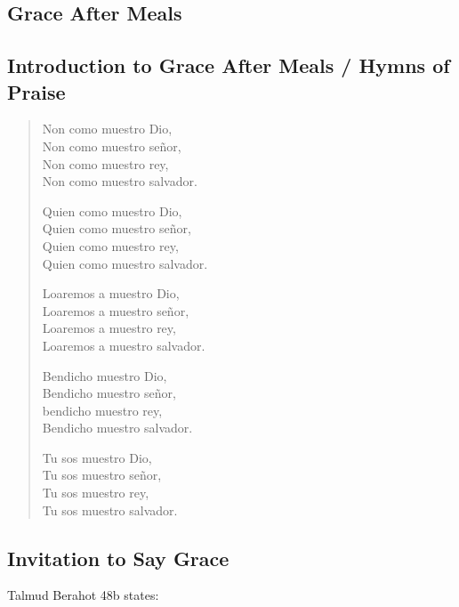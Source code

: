 ﻿\documentclass[a5paper, 12pt]{Birchon}
\begin{document}
\begin{english}
\section*{Grace After Meals}
\subsection*{Introduction to Grace After Meals / Hymns of Praise}
\begin{verse}

Non como muestro Dio,\\Non como muestro señor,\\
Non como muestro rey,\\Non como muestro salvador.

Quien como muestro Dio,\\Quien como muestro señor,\\
Quien como muestro rey,\\Quien como muestro salvador.

Loaremos a muestro Dio,\\Loaremos a muestro señor,\\
Loaremos a muestro rey,\\Loaremos a muestro salvador.

Bendicho muestro Dio,\\Bendicho muestro señor,\\
bendicho muestro rey,\\Bendicho muestro salvador.

Tu sos muestro Dio,\\Tu sos muestro señor,\\
Tu sos muestro rey,\\Tu sos muestro salvador.

\end{verse}
\end{english}

\eject

\begin{english}
\subsection*{Invitation to Say Grace}
\end{english}

\regPage{
}
{}
{
Talmud Berahot 48b states:
\begin{quote}
\end{quote}

}
\end{document}
